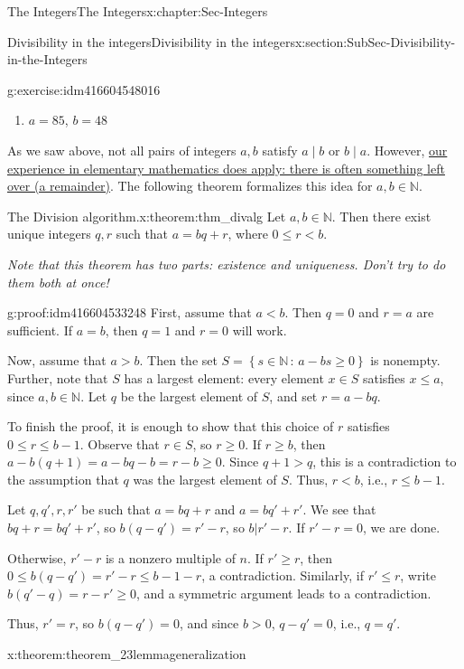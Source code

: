 \documentclass[oneside,10pt,]{book}
\numberwithin{equation}{section}
\renewcommand{\le}{\leqslant}
\renewcommand{\ge}{\geqslant}
\newcommand{\setof}[2]{{\left\{#1\,\colon\,#2\right\}}}
\def\N{{\mathbb N}}
\newcommand{\lt}{<}
\begin{document}
\begin{chapterptx}{The Integers}{}{The Integers}{}{}{x:chapter:Sec-Integers}
\begin{sectionptx}{Divisibility in the integers}{}{Divisibility in the integers}{}{}{x:section:SubSec-Divisibility-in-the-Integers}
\begin{inlineexercise}{}{g:exercise:idm416604548016}
\begin{enumerate}
\item{}\(a= 85\), \(b = 48\)%
\end{enumerate}
%
\end{inlineexercise}
As we saw above, not all pairs of integers \(a,b\) satisfy \(a\mid b\) or \(b\mid a\). However, \href{http://www.corestandards.org/Math/Content/4/NBT/B/6/}{our experience in elementary mathematics does apply: there is often something left over (a remainder)}. The following theorem formalizes this idea for \(a,b\in \N\).%
\begin{theorem}{The Division algorithm.}{}{x:theorem:thm_divalg}%
Let \(a,b\in \N\). Then there exist unique integers \(q,r\) such that \(a = bq + r\), where \(0 \le r \lt b\).%
\par
\emph{Note that this theorem has two parts: existence and uniqueness. Don't try to do them both at once!}%
\end{theorem}
\begin{proofptx}{}{g:proof:idm416604533248}
First, assume that \(a \lt b\). Then \(q = 0\) and \(r = a\) are sufficient. If \(a = b\), then \(q = 1\) and \(r = 0\) will work.%
\par
Now, assume that \(a > b\). Then the set \(S = \setof{s\in\N}{a-bs \ge 0}\) is nonempty. Further, note that \(S\) has a largest element: every element \(x\in S\) satisfies \(x \le a\), since \(a,b\in\N\). Let \(q\) be the largest element of \(S\), and set \(r = a - bq\).%
\par
To finish the proof, it is enough to show that this choice of \(r\) satisfies \(0\le r \le b-1\). Observe that \(r\in S\), so \(r\ge 0\). If \(r \ge b\), then \(a - b(q+1) = a-bq -b = r -b \ge 0\). Since \(q+1 > q\), this is a contradiction to the assumption that \(q\) was the largest element of \(S\). Thus, \(r \lt b\), i.e., \(r \le b-1\).%
\par
Let \(q,q',r,r'\) be such that \(a = bq+r\) and \(a=bq'+r'\). We see that \(bq+r = bq' + r'\), so \(b(q-q') = r'-r\), so \(b|r'-r\). If \(r'-r = 0\), we are done.%
\par
Otherwise, \(r'-r\) is a nonzero multiple of \(n\). If \(r' \ge r\), then \(0\le b(q-q') = r' - r \le b-1 - r\), a contradiction. Similarly, if \(r' \le r\), write \(b(q'-q) = r-r' \ge 0\), and a symmetric argument leads to a contradiction.%
\par
Thus, \(r' = r\), so \(b(q-q') = 0\), and since \(b > 0\), \(q - q'= 0\), i.e., \(q = q'\).%
\end{proofptx}
\begin{theorem}{}{}{x:theorem:theorem_23lemmageneralization}%

\end{theorem}
\end{sectionptx}
\end{chapterptx}
\end{document}
